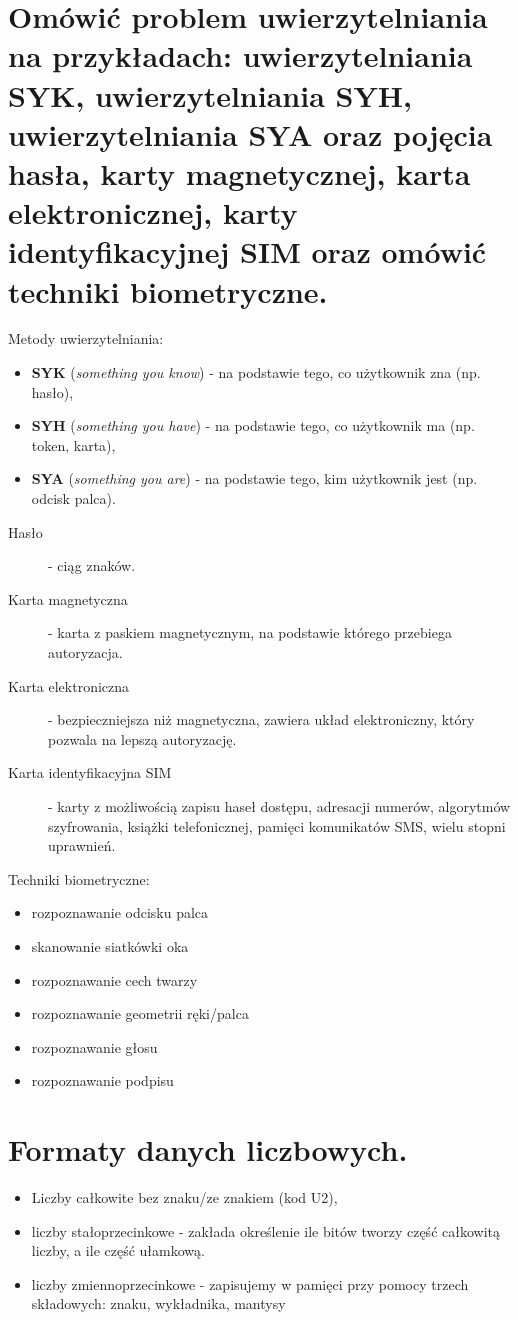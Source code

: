 \documentclass[12pt,a4paper]{article}
\begin{document}
	\section{Omówić problem uwierzytelniania na przykładach: uwierzytelniania SYK, uwierzytelniania SYH, uwierzytelniania SYA oraz pojęcia hasła, karty magnetycznej, karta elektronicznej, karty identyfikacyjnej SIM oraz omówić techniki biometryczne.}
	Metody uwierzytelniania:
	\begin{itemize}
		\item \textbf{SYK} (\textit{something you know}) - na podstawie tego, co użytkownik zna (np. hasło),
		\item \textbf{SYH} (\textit{something you have}) - na podstawie tego, co użytkownik ma (np. token, karta),
		\item \textbf{SYA} (\textit{something you are}) - na podstawie tego, kim użytkownik jest (np. odcisk palca).
	\end{itemize}

	\begin{description}
		\item[Hasło] - ciąg znaków.
		\item[Karta magnetyczna] - karta z paskiem magnetycznym, na podstawie którego przebiega autoryzacja.
		\item[Karta elektroniczna] - bezpieczniejsza niż magnetyczna, zawiera układ elektroniczny, który pozwala na lepszą autoryzację.
		\item[Karta identyfikacyjna SIM] - karty z możliwością zapisu haseł dostępu, adresacji numerów, algorytmów szyfrowania, książki telefonicznej, pamięci komunikatów SMS, wielu stopni uprawnień.
	\end{description}

Techniki biometryczne:
	\begin{itemize}
		\item rozpoznawanie odcisku palca
		\item skanowanie siatkówki oka
		\item rozpoznawanie cech twarzy
		\item rozpoznawanie geometrii ręki/palca
		\item rozpoznawanie głosu
		\item rozpoznawanie podpisu
	\end{itemize}

	\section{Formaty danych liczbowych.}
	\begin{itemize}
		\item Liczby całkowite bez znaku/ze znakiem (kod U2), 
		\item liczby stałoprzecinkowe - zakłada określenie ile bitów tworzy część całkowitą liczby, a ile część ułamkową. 
		\item liczby zmiennoprzecinkowe - zapisujemy w pamięci przy pomocy trzech składowych: znaku, wykładnika, mantysy
	\end{itemize}
\end{document}
